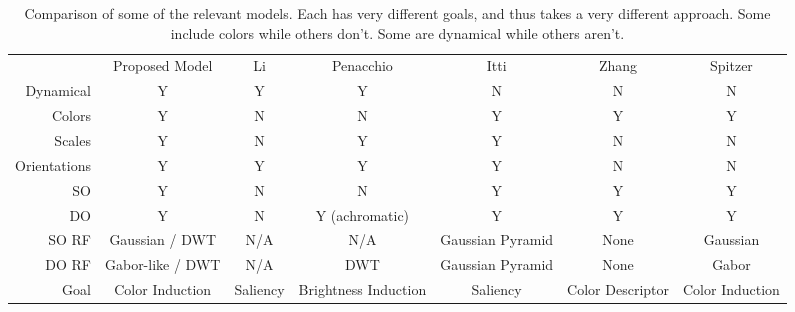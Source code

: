 \documentclass[journal,onecolumn]{IEEEtran}
\begin{document}
\begin{table}[H]
    \centering
    \begin{tabular}{rcccccc}
        \multicolumn{1}{r|}{}                 & Proposed Model        & Li \cite{li:1999}     & Penacchio \cite{otazu:plosone} & Itti             & Zhang            & Spitzer \\ \cline{1-7}
        \multicolumn{1}{r|}{Dynamical}        & Y                      & Y                    & Y                              & N                & N                & N               \\
        \multicolumn{1}{r|}{Colors}           & Y                      & N                    & N                              & Y                & Y                & Y               \\
        \multicolumn{1}{r|}{Scales}           & Y                      & N                    & Y                              & Y                & N                & N               \\
        \multicolumn{1}{r|}{Orientations}     & Y                      & Y                    & Y                              & Y                & N                & N               \\
        \multicolumn{1}{r|}{SO}               & Y                      & N                    & N                              & Y                & Y                & Y               \\
        \multicolumn{1}{r|}{DO}               & Y                      & N                    & Y (achromatic)                 & Y                & Y                & Y               \\
        \multicolumn{1}{r|}{SO RF}            & Gaussian / DWT         & N/A                  & N/A                            & Gaussian Pyramid & None             & Gaussian        \\
        \multicolumn{1}{r|}{DO RF}            & Gabor-like / DWT       & N/A                  & DWT                            & Gaussian Pyramid & None             & Gabor           \\
        \multicolumn{1}{r|}{Goal}             & Color Induction        & Saliency             & Brightness Induction           & Saliency         & Color Descriptor & Color Induction
    \end{tabular}
    \caption{Comparison of some of the relevant models. Each has very different goals, and thus takes a very different approach. Some include colors while others don't. Some are dynamical while others aren't.}
    \label{tab:model-comparison}
\end{table}
\end{document}
